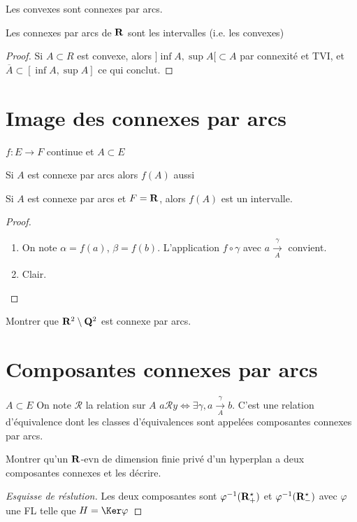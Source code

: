 \begin{ex}
Les convexes sont connexes par arcs.
\end{ex}

\begin{prop}
    Les connexes par arcs de $\mathbf R$ sont les intervalles (i.e. les convexes)
\end{prop}

\begin{proof}
    Si $A\subset R$ est convexe, alors  $]\inf A, \sup A[\subset A$ par connexité et TVI, et $\overline{ A }\subset [\inf A, \sup A]$ ce qui conclut.
\end{proof}

\section{Image des connexes par arcs}

\begin{thm}
\Hyp $f:E\to F$ continue et $A\subset E$
 \begin{concenum}
 \item Si $A$ est connexe par arcs alors $f(A)$ aussi
 \item Si  $A$ est connexe par arcs et  $F=\mathbf R$, alors $f(A)$ est un intervalle.
\end{concenum}
\end{thm}

\begin{proof}~
\begin{enumerate}
    \item On note $\alpha = f(a)$,  $\beta=f(b)$. L'application  $f\circ \gamma$ avec  $a \xrightarrow[A]{\gamma}$ convient.
    \item Clair.
\end{enumerate}
\end{proof}

\begin{exo}
Montrer que $\mathbf R^2\setminus \mathbf Q^2$ est connexe par arcs.
\end{exo}

\section{Composantes connexes par arcs}

\begin{defprop}
\Hyp $A\subset E$
\Conc On note  $\mathcal  R$ la relation sur $A$  $a\mathcal Ry\iff \exists \gamma , a \xrightarrow[A]{\gamma}b$. C'est une relation d'équivalence dont les classes d'équivalences sont appelées composantes connexes par arcs.
\end{defprop}

\begin{exo}
    Montrer qu'un $\mathbf R$-evn de dimension finie privé d'un hyperplan a deux composantes connexes et les décrire.
\end{exo}

\begin{proof}[Esquisse de réslution]
    Les deux composantes sont $\varphi^{-1}(\mathbf R_+^\star)$ et $\varphi^{-1}(\mathbf R_-^\star)$ avec $\varphi$ une FL telle que $H=\Ker\varphi$
\end{proof}
